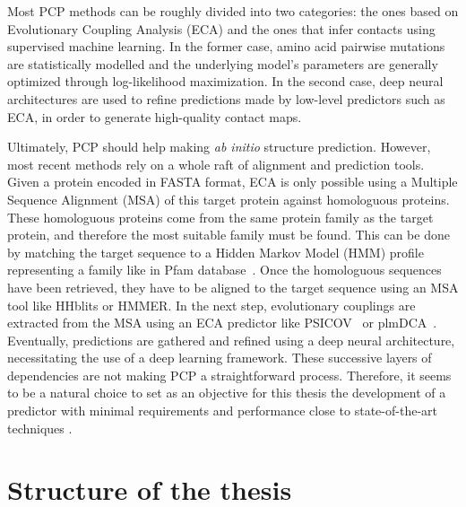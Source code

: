    Most PCP methods can be roughly divided into two categories:
    the ones based on Evolutionary Coupling Analysis (ECA) and the ones that infer contacts using
    supervised machine learning. In the former case, amino acid pairwise mutations are statistically modelled and the underlying model's parameters
    are generally optimized through log-likelihood maximization. In the second case, deep neural architectures are used to
    refine predictions made by low-level predictors such as ECA, in order to generate high-quality contact maps.

    Ultimately, PCP should help making \textit{ab initio} structure prediction.
    However, most recent methods rely on a whole raft of alignment and prediction tools.
    Given a protein encoded in FASTA format, ECA is only possible using a Multiple Sequence Alignment (MSA)
    of this target protein against homologuous proteins. These homologuous proteins come from the same protein family
    as the target protein, and therefore the most suitable family must be found.
    This can be done by matching the target sequence to a Hidden Markov Model (HMM) profile representing a family
    like in Pfam database~\cite{Pfam}. Once the homologuous sequences have been retrieved, they have to be aligned to
    the target sequence using an MSA tool like HHblits or HMMER. In the next step, evolutionary couplings are extracted from
    the MSA using an ECA predictor like PSICOV~\cite{doi:10.1093/bioinformatics/btr638} or plmDCA~\cite{EKEBERG2014341}.
    Eventually, predictions are gathered and refined using a deep neural architecture, necessitating the use
    of a deep learning framework. These successive layers of dependencies are not making PCP a straightforward process.
    Therefore, it seems to be a natural choice to set as an objective for this thesis the development of a predictor with
    minimal requirements and performance close to state-of-the-art techniques
    \cite{RaptorX, DeepContact, doi:10.1093/bioinformatics/bty341, Michel383133, DeepMind}.

\section{Structure of the thesis}

